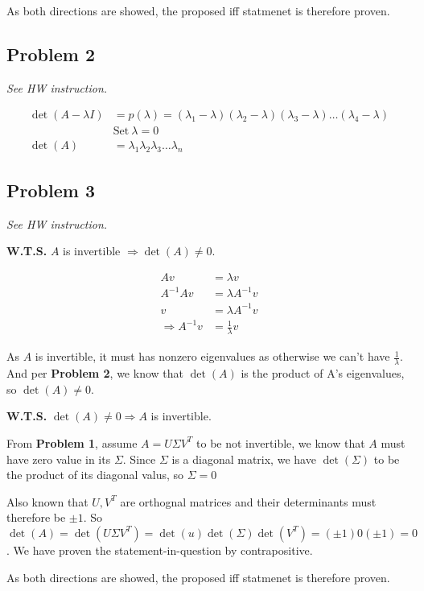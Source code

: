 \documentclass[11pt]{article}
\begin{document}
\noindent As both directions are showed, the proposed iff statmenet is therefore proven.

\subsection*{Problem 2}
\textit{See HW instruction.}\newline

\begin{align*}
    \det(A - \lambda I) &= p(\lambda) = (\lambda_1 - \lambda)(\lambda_2 - \lambda)(\lambda_3 - \lambda) \dots (\lambda_4 - \lambda) \\
    &\text{Set} \ \lambda = 0 \\
    \det(A) &= \lambda_1 \lambda_2 \lambda_3 \dots \lambda_n
\end{align*}


\subsection*{Problem 3}
\textit{See HW instruction.}\newline

\noindent\textbf{W.T.S.}  $A$ is invertible $\Longrightarrow \det(A) \neq 0$.


\begin{align*}
    Av &= \lambda v \\
    A^{-1} Av &=  \lambda A^{-1} v \\
    v &= \lambda A^{-1} v \\
    \Longrightarrow A^{-1} v &= \frac{1}{\lambda} v
\end{align*}

As $A$ is invertible, it must has nonzero eigenvalues as otherwise we can't have $\frac{1}{\lambda}$. And per \textbf{Problem 2}, we know that $\det(A)$ is the product of A's eigenvalues, so $\det(A) \neq 0$.\newline

\noindent\textbf{W.T.S.}  $\det(A) \neq 0 \Longrightarrow A$ is invertible.

From \textbf{Problem 1}, assume $A = U \Sigma V^T $ to be not invertible, we know that $A$ must have zero value in its $\Sigma$. Since $\Sigma$ is a diagonal matrix, we have $\det(\Sigma)$ to be the product of its diagonal valus, so $\Sigma = 0$

Also known that $U, V^T$ are orthognal matrices and their determinants must therefore be $\pm 1$. So $\det(A) = \det(U \Sigma V^T) = \det(u) \det(\Sigma)  \det(V^T) = (\pm 1) 0 (\pm 1) = 0$. We have proven the statement-in-question by contrapositive.\newline


\noindent As both directions are showed, the proposed iff statmenet is therefore proven.
\end{document}
